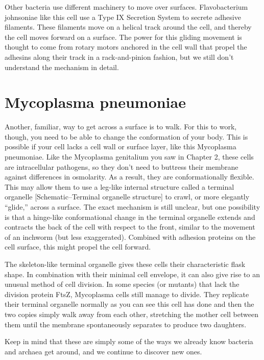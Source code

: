 \documentclass[]{tufte-book}
\begin{document}
Other bacteria use different machinery to move over surfaces.
Flavobacterium johnsoniae like this cell use a Type IX Secretion System
to secrete adhesive filaments. These filaments move on a helical track
around the cell, and thereby the cell moves forward on a surface. The
power for this gliding movement is thought to come from rotary motors
anchored in the cell wall that propel the adhesins along their track in
a rack-and-pinion fashion, but we still don't understand the mechanism
in detail.

\section{Mycoplasma pneumoniae}\label{mycoplasma-pneumoniae}

Another, familiar, way to get across a surface is to walk. For this to
work, though, you need to be able to change the conformation of your
body. This is possible if your cell lacks a cell wall or surface layer,
like this Mycoplasma pneumoniae. Like the Mycoplasma genitalium you saw
in Chapter 2, these cells are intracellular pathogens, so they don't
need to buttress their membrane against differences in osmolarity. As a
result, they are conformationally flexible. This may allow them to use a
leg-like internal structure called a terminal organelle
{[}Schematic--Terminal organelle structure{]} to crawl, or more
elegantly ``glide,'' across a surface. The exact mechanism is still
unclear, but one possibility is that a hinge-like conformational change
in the terminal organelle extends and contracts the back of the cell
with respect to the front, similar to the movement of an inchworm (but
less exaggerated). Combined with adhesion proteins on the cell surface,
this might propel the cell forward.

The skeleton-like terminal organelle gives these cells their
characteristic flask shape. In combination with their minimal cell
envelope, it can also give rise to an unusual method of cell division.
In some species (or mutants) that lack the division protein FtsZ,
Mycoplasma cells still manage to divide. They replicate their terminal
organelle normally as you can see this cell has done and then the two
copies simply walk away from each other, stretching the mother cell
between them until the membrane spontaneously separates to produce two
daughters.

Keep in mind that these are simply some of the ways we already know
bacteria and archaea get around, and we continue to discover new ones.
\end{document}
